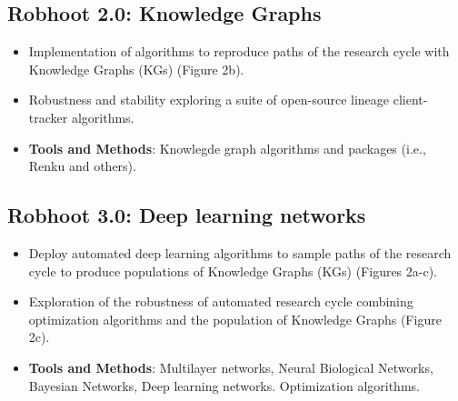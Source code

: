 \documentclass[10pt, a4paper, twocolumn]{article} %
\begin{document}
{  \subsection{Robhoot 2.0: Knowledge Graphs}
  \begin{itemize}
  \item Implementation of algorithms to reproduce paths of the
    research cycle with Knowledge Graphs (KGs) (Figure 2b).
  \item Robustness and stability exploring a suite of open-source
    lineage client-tracker algorithms.
  \end{itemize}

   \begin{itemize}
   \item {\bf Tools and Methods}: Knowlegde graph algorithms and
     packages (i.e., Renku and others).
 \end{itemize}
  \vspace{-0.15 in}
  
  \subsection{Robhoot 3.0: Deep learning networks}
  \begin{itemize}
  \item Deploy automated deep learning algorithms to sample paths of
    the research cycle to produce populations of Knowledge Graphs
    (KGs) (Figures 2a-c).
  \item Exploration of the robustness of automated research cycle combining
    optimization algorithms and the population of Knowledge Graphs
    (Figure 2c).
  \end{itemize}

 \begin{itemize}
 \item {\bf Tools and Methods}: Multilayer networks, Neural Biological
   Networks, Bayesian Networks, Deep learning networks. Optimization
   algorithms.
 \end{itemize}
  
  \vspace{-0.15 in}
  
}
\end{document}
